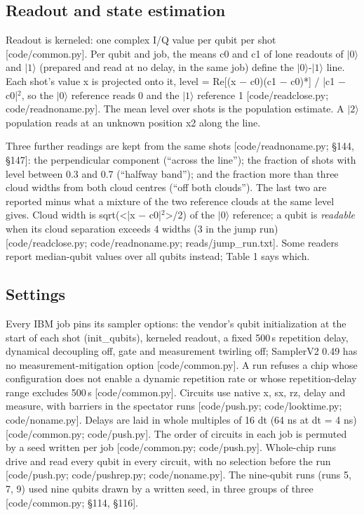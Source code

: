\documentclass[11pt]{article}
\begin{document}
\subsection{Readout and state estimation}
Readout is kerneled: one complex I/Q value per qubit per shot {[}code/common.py{]}. Per qubit and job, the means c0 and c1 of lone readouts of \(|0\rangle\) and \(|1\rangle\) (prepared and read at no delay, in the same job) define the \(|0\rangle\)-\(|1\rangle\) line. Each shot's value x is projected onto it, level = Re{[}(x \(-\) c0)(c1 \(-\) c0)*{]} / |c1 \(-\) c0|\(^2\), so the \(|0\rangle\) reference reads 0 and the \(|1\rangle\) reference 1 {[}code/readclose.py; code/readnoname.py{]}. The mean level over shots is the population estimate. A \(|2\rangle\) population reads at an unknown position x2 along the line.

Three further readings are kept from the same shots {[}code/readnoname.py; \S{}144, \S{}147{]}: the perpendicular component (``across the line''); the fraction of shots with level between 0.3 and 0.7 (``halfway band''); and the fraction more than three cloud widths from both cloud centres (``off both clouds''). The last two are reported minus what a mixture of the two reference clouds at the same level gives. Cloud width is sqrt(\textless{}|x \(-\) c0|\(^2\)\textgreater{}/2) of the \(|0\rangle\) reference; a qubit is \emph{readable} when its cloud separation exceeds 4 widths (3 in the jump run) {[}code/readclose.py; code/readnoname.py; reads/jump\_run.txt{]}. Some readers report median-qubit values over all qubits instead; Table 1 says which.

\subsection{Settings}
Every IBM job pins its sampler options: the vendor's qubit initialization at the start of each shot (init\_qubits), kerneled readout, a fixed 500\,\textmu s repetition delay, dynamical decoupling off, gate and measurement twirling off; SamplerV2 0.49 has no measurement-mitigation option {[}code/common.py{]}. A run refuses a chip whose configuration does not enable a dynamic repetition rate or whose repetition-delay range excludes 500\,\textmu s {[}code/common.py{]}. Circuits use native x, sx, rz, delay and measure, with barriers in the spectator runs {[}code/push.py; code/looktime.py; code/noname.py{]}. Delays are laid in whole multiples of 16 dt (64 ns at dt = 4 ns) {[}code/common.py; code/push.py{]}. The order of circuits in each job is permuted by a seed written per job {[}code/common.py; code/push.py{]}. Whole-chip runs drive and read every qubit in every circuit, with no selection before the run {[}code/push.py; code/pushrep.py; code/noname.py{]}. The nine-qubit runs (runs 5, 7, 9) used nine qubits drawn by a written seed, in three groups of three {[}code/common.py; \S{}114, \S{}116{]}.
\end{document}
